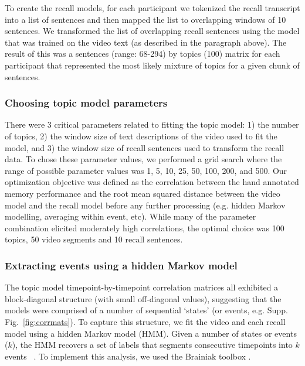 \documentclass{article}
\begin{document}
{To create the recall models, for each participant we tokenized the recall transcript into a list of sentences and then mapped the list to overlapping windows of 10 sentences.  We transformed the list of overlapping recall sentences using the model that was trained on the video text (as described in the paragraph above). The result of this was a sentences (range: 68-294) by topics (100) matrix for each participant that represented the most likely mixture of topics for a given chunk of sentences.

\subsubsection{Choosing topic model parameters}
There were 3 critical parameters related to fitting the topic model: 1) the number of topics, 2) the window size of text descriptions of the video used to fit the model, and 3) the window size of recall sentences used to transform the recall data.  To chose these parameter values, we performed a grid search where the range of possible parameter values was 1, 5, 10, 25, 50, 100, 200, and 500. Our optimization objective was defined as the correlation between the hand annotated memory performance and the root mean squared distance between the video model and the recall model before any further processing (e.g. hidden Markov modelling, averaging within event, etc). While many of the parameter combination elicited moderately high correlations, the optimal choice was 100 topics, 50 video segments and 10 recall sentences.

\subsubsection{Extracting events using a hidden Markov model}
The topic model timepoint-by-timepoint correlation matrices all exhibited a block-diagonal structure (with small off-diagonal values), suggesting that the models were comprised of a number of sequential `states' (or events, e.g. Supp. Fig.~\ref{fig:corrmats}). To capture this structure, we fit the video and each recall model using a hidden Markov model (HMM). Given a number of states or events ($k$), the HMM recovers a set of labels that segments consecutive timepoints into $k$ events ~\citep{Rabi89, BaldEtal17}. To implement this analysis, we used the Brainiak toolbox \citep{BaldEtal17, Brainiak}.

}
\end{document}
